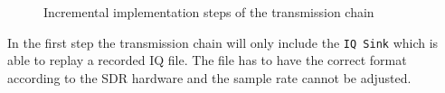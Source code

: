 \begin{figure}


\caption{Incremental implementation steps of the transmission chain}
\label{fig:tx_chain}
\end{figure}

In the first step the transmission chain will only include the \texttt{IQ Sink} which is
able to replay a recorded IQ file. The file has to have the correct format according
to the \ac{SDR} hardware and the sample rate cannot be adjusted.

